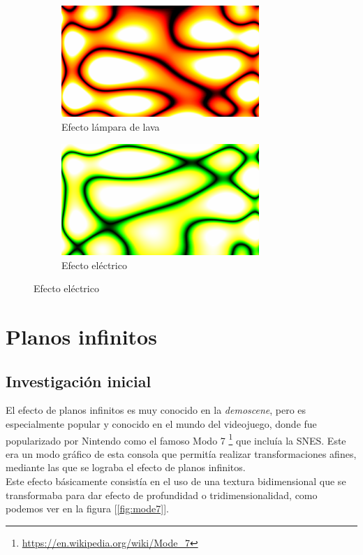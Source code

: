 \begin{figure}[h]
	\centering
	\begin{subfigure}[b]{0.48\textwidth}
		\centering
		\includegraphics[width=7.5cm]{archivos/redplasma}
		\caption{Efecto lámpara de lava}
	\end{subfigure}
	\begin{subfigure}[b]{0.48\textwidth}
		\centering
		\includegraphics[width=7.5cm]{archivos/greenplasma}
		\caption{Efecto eléctrico}
	\end{subfigure}
\end{figure}

\section{Planos infinitos} \label{sec:planes}

\subsection{Investigación inicial}

El efecto de planos infinitos es muy conocido en la \emph{demoscene}, pero es especialmente popular y conocido en el mundo del videojuego, donde fue popularizado por Nintendo como el famoso Modo 7 \footnote{\url{https://en.wikipedia.org/wiki/Mode_7}} que incluía la SNES. Este era un modo gráfico de esta consola que permitía realizar transformaciones afines, mediante las que se lograba el efecto de planos infinitos.\\

Este efecto básicamente consistía en el uso de una textura bidimensional que se transformaba para dar efecto de profundidad o tridimensionalidad, como podemos ver en la figura [\ref{fig:mode7}].\\

